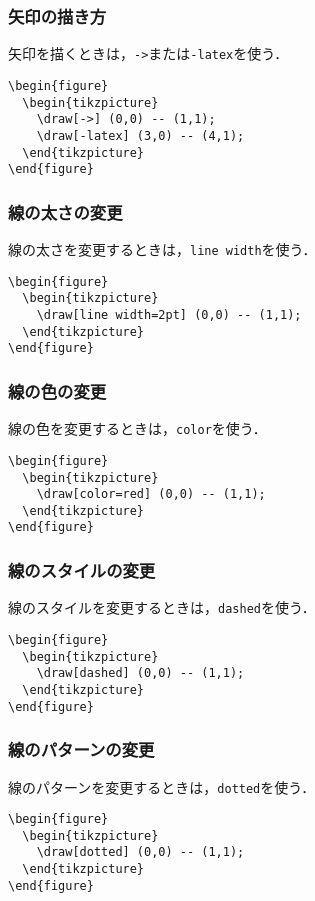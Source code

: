 \subsubsection{矢印の描き方}
矢印を描くときは，\texttt{->}または\texttt{-latex}を使う．
\begin{lstlisting}
\begin{figure}
  \begin{tikzpicture}
    \draw[->] (0,0) -- (1,1);
    \draw[-latex] (3,0) -- (4,1);
  \end{tikzpicture}
\end{figure}
\end{lstlisting}
\subsubsection{線の太さの変更}
線の太さを変更するときは，\texttt{line width}を使う．
\begin{lstlisting}
\begin{figure}
  \begin{tikzpicture}
    \draw[line width=2pt] (0,0) -- (1,1);
  \end{tikzpicture}
\end{figure}
\end{lstlisting}
\subsubsection{線の色の変更}
線の色を変更するときは，\texttt{color}を使う．
\begin{lstlisting}
\begin{figure}
  \begin{tikzpicture}
    \draw[color=red] (0,0) -- (1,1);
  \end{tikzpicture}
\end{figure}
\end{lstlisting}
\newpage
\subsubsection{線のスタイルの変更}
線のスタイルを変更するときは，\texttt{dashed}を使う．
\begin{lstlisting}
\begin{figure}
  \begin{tikzpicture}
    \draw[dashed] (0,0) -- (1,1);
  \end{tikzpicture}
\end{figure}
\end{lstlisting}
\subsubsection{線のパターンの変更}
線のパターンを変更するときは，\texttt{dotted}を使う．
\begin{lstlisting}
\begin{figure}
  \begin{tikzpicture}
    \draw[dotted] (0,0) -- (1,1);
  \end{tikzpicture}
\end{figure}
\end{lstlisting}
